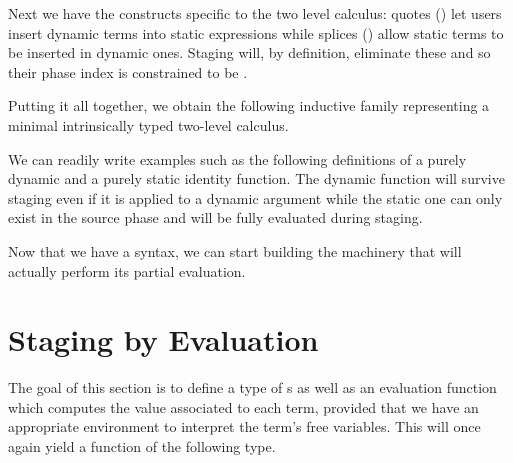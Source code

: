 
Next we have the constructs specific to the two level calculus:
quotes () let users insert dynamic terms into static
expressions while splices () allow static terms to
be inserted in dynamic ones.
%
Staging will, by definition, eliminate these and so their phase
index is constrained to be .



Putting it all together, we obtain the following inductive
family representing a minimal intrinsically typed two-level
calculus.

\begin{AgdaAlign}
  \begin{AgdaSuppressSpace}
  \end{AgdaSuppressSpace}
\end{AgdaAlign}

We can readily write examples such as the following definitions
of a purely dynamic and a purely static identity function. The
dynamic function will survive staging even if it is applied to a
dynamic argument while the static one can only exist in the
source phase and will be fully evaluated during staging.

\noindent
\begin{minipage}{.21\textwidth}
\end{minipage}\hfill
\begin{minipage}{.23\textwidth}
\end{minipage}

Now that we have a syntax, we can start building the machinery
that will actually perform its partial evaluation.

\section{Staging by Evaluation}

The goal of this section is to define a type of s
as well as an evaluation function which computes the
value associated to each term, provided that we have an
appropriate environment to interpret the term's free variables.
%
This will once again yield a function  of the following type.


